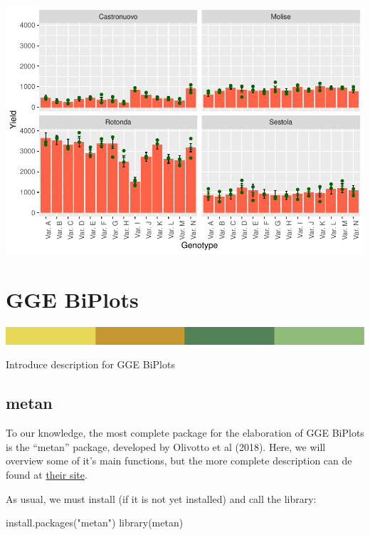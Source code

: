 \documentclass[
]{book}
\newenvironment{Shaded}{\begin{snugshade}}{\end{snugshade}}
\newcommand{\FunctionTok}[1]{\textcolor[rgb]{0.00,0.00,0.00}{#1}}
\newcommand{\NormalTok}[1]{#1}
\newcommand{\StringTok}[1]{\textcolor[rgb]{0.31,0.60,0.02}{#1}}
\begin{document}
\includegraphics{PPB-Toolkit-for-R-and-R-Studio_files/figure-latex/unnamed-chunk-121-1.pdf}

\hypertarget{gge-biplots}{%
\chapter{GGE BiPlots}\label{gge-biplots}}

\includegraphics{rsrstrip.png}

Introduce description for GGE BiPlots

\hypertarget{metan-1}{%
\section{metan}\label{metan-1}}

To our knowledge, the most complete package for the elaboration of GGE BiPlots is the ``metan'' package, developed by Olivotto et al (2018). Here, we will overview some of it's main functions, but the more complete description can de found at \href{https://tiagoolivoto.github.io/metan/articles/vignettes_gge.html}{their site}.

As usual, we must install (if it is not yet installed) and call the library:

\begin{Shaded}
\begin{Highlighting}[]
\FunctionTok{install.packages}\NormalTok{(}\StringTok{"metan"}\NormalTok{)}
\FunctionTok{library}\NormalTok{(metan)}
\end{Highlighting}
\end{Shaded}
\end{document}

